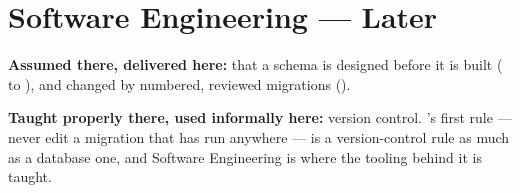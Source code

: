 \section{Software Engineering --- Later}

\begin{tight}
  \item \textbf{Assumed there, delivered here:} that a schema is designed
        before it is built ( to ), and changed by
        numbered, reviewed migrations ().
  \item \textbf{Taught properly there, used informally here:} version
        control. 's first rule --- never edit a migration that
        has run anywhere --- is a version-control rule as much as a database
        one, and Software Engineering is where the tooling behind it is taught.
\end{tight}
